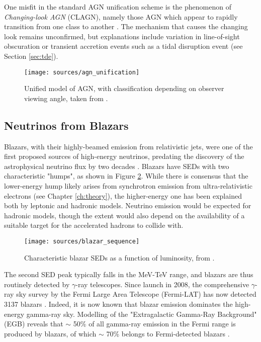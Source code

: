 One misfit in the standard AGN unification scheme is the phenomenon of \emph{Changing-look AGN} (CLAGN), namely those AGN which appear to rapidly transition from one class to another . The mechanism that causes the changing look remains unconfirmed, but explanations include variation in line-of-sight obscuration or transient accretion events such as a tidal disruption event (see Section \ref{sec:tde}).

\begin{figure}[!ht]
	\centering \texttt{[image: sources/agn\_unification]}
	\caption{Unified model of AGN, with classification depending on observer viewing angle, taken from \cite{2012agn..book.....B}.}
	\label{fig:agn_unification}
\end{figure}

\subsection*{Neutrinos from Blazars}
Blazars, with their highly-beamed emission from relativistic jets, were one of the first proposed sources of high-energy neutrinos, predating the discovery of the astrophysical neutrino flux by two decades . Blazars have SEDs with two characteristic "humps", as shown in Figure \ref{fig:blazar_sequence}. While there is consensus that the lower-energy hump likely arises from synchrotron emission from ultra-relativistic electrons (see Chapter \ref{ch:theory}),  the higher-energy one has been explained both by leptonic and hadronic models. Neutrino emission would be expected for hadronic models, though the extent would also depend on the availability of a suitable target for the accelerated hadrons to collide with.

\begin{figure}[!ht]
	\centering \texttt{[image: sources/blazar\_sequence]}
	\caption{Characteristic blazar SEDs as a function of luminosity, from \cite{16_blazar_sequence}.}
	\label{fig:blazar_sequence}
\end{figure}

The second SED peak typically falls in the MeV-TeV range, and blazars are thus routinely detected by $\gamma$-ray telescopes. Since launch in 2008, the comprehensive $\gamma$-ray sky survey by the Fermi Large Area Telescope (Fermi-LAT) has now detected 3137 blazars . Indeed, it is now known that blazar emission dominates the high-energy gamma-ray sky. Modelling of the "Extragalactic Gamma-Ray Background" (EGB) reveals that $\sim$ 50\% of all gamma-ray emission in the Fermi range is produced by blazars, of which $\sim$ 70\% belongs to Fermi-detected blazars .  

